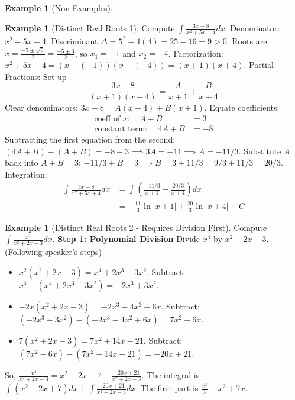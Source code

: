 \documentclass[11pt]{article}
\theoremstyle{plain}
\theoremstyle{definition}
\newtheorem{example}[theorem]{Example}
\theoremstyle{remark}
\newcommand{\abs}[1]{\left|#1\right|}
\begin{document}
\begin{example}[Non-Examples]
\begin{example}[Distinct Real Roots 1]
Compute $\int \frac{3x-8}{x^2+5x+4} dx$.
Denominator: $x^2+5x+4$. Discriminant $\Delta = 5^2 - 4(4) = 25-16=9 > 0$. Roots are $x = \frac{-5 \pm \sqrt{9}}{2} = \frac{-5 \pm 3}{2}$, so $x_1 = -1$ and $x_2 = -4$.
Factorization: $x^2+5x+4 = (x-(-1))(x-(-4)) = (x+1)(x+4)$.
Partial Fractions: Set up
\[ \frac{3x-8}{(x+1)(x+4)} = \frac{A}{x+1} + \frac{B}{x+4} \]
Clear denominators: $3x-8 = A(x+4) + B(x+1)$.
Equate coefficients:
\begin{align*} \text{coeff of } x: \quad A+B &= 3 \\ \text{constant term: } \quad 4A+B &= -8 \end{align*}
Subtracting the first equation from the second: $(4A+B)-(A+B) = -8-3 \implies 3A = -11 \implies A = -11/3$.
Substitute $A$ back into $A+B=3$: $-11/3 + B = 3 \implies B = 3 + 11/3 = 9/3 + 11/3 = 20/3$.
Integration:
\begin{align*} \int \frac{3x-8}{x^2+5x+4} dx &= \int \left( \frac{-11/3}{x+1} + \frac{20/3}{x+4} \right) dx \\ &= -\frac{11}{3} \ln\abs{x+1} + \frac{20}{3} \ln\abs{x+4} + C \end{align*}
\end{example}

\begin{example}[Distinct Real Roots 2 - Requires Division First]
Compute $\int \frac{x^4}{x^2+2x-3} dx$.
\textbf{Step 1: Polynomial Division}
Divide $x^4$ by $x^2+2x-3$. (Following speaker's steps)
\begin{itemize}
    \item $x^2(x^2+2x-3) = x^4+2x^3-3x^2$. Subtract: $x^4 - (x^4+2x^3-3x^2) = -2x^3+3x^2$.
    \item $-2x(x^2+2x-3) = -2x^3-4x^2+6x$. Subtract: $(-2x^3+3x^2) - (-2x^3-4x^2+6x) = 7x^2-6x$.
    \item $7(x^2+2x-3) = 7x^2+14x-21$. Subtract: $(7x^2-6x) - (7x^2+14x-21) = -20x+21$.
\end{itemize}
So, $\frac{x^4}{x^2+2x-3} = x^2-2x+7 + \frac{-20x+21}{x^2+2x-3}$.
The integral is $\int (x^2-2x+7) dx + \int \frac{-20x+21}{x^2+2x-3} dx$.
The first part is $\frac{x^3}{3} - x^2 + 7x$.


\end{example}
\end{example}
\end{document}
